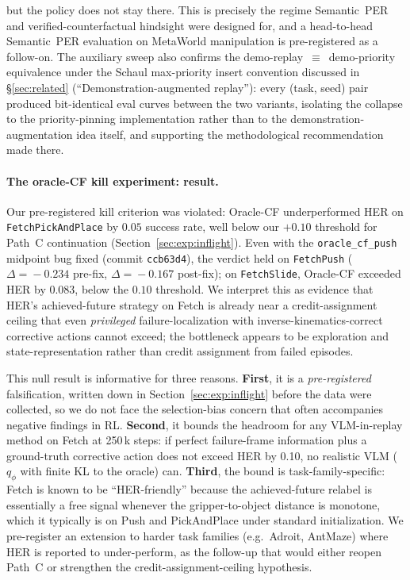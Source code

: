 \documentclass{article}
\begin{document}
but the policy does not stay there. This is precisely the regime
Semantic~PER and verified-counterfactual hindsight were designed for,
and a head-to-head Semantic~PER evaluation on MetaWorld manipulation
is pre-registered as a follow-on. The auxiliary sweep also confirms
the demo-replay~$\equiv$~demo-priority equivalence under the Schaul
max-priority insert convention discussed in \S\ref{sec:related}
(``Demonstration-augmented replay''): every (task, seed) pair
produced bit-identical eval curves between the two variants, isolating
the collapse to the priority-pinning implementation rather than to the
demonstration-augmentation idea itself, and supporting the
methodological recommendation made there.

\paragraph{The oracle-CF kill experiment: result.}
Our pre-registered kill criterion was violated: Oracle-CF underperformed
HER on \texttt{FetchPickAndPlace} by $0.05$ success rate, well below
our $+0.10$ threshold for Path~C continuation
(Section~\ref{sec:exp:inflight}). Even with the
\texttt{oracle\_cf\_push} midpoint bug fixed (commit \texttt{ccb63d4}),
the verdict held on \texttt{FetchPush} ($\Delta\!=\!-0.234$ pre-fix,
$\Delta\!=\!-0.167$ post-fix); on \texttt{FetchSlide}, Oracle-CF exceeded
HER by $0.083$, below the $0.10$ threshold. We interpret this as
evidence that HER's achieved-future strategy on Fetch is already near a
credit-assignment ceiling that even \emph{privileged} failure-localization
with inverse-kinematics-correct corrective actions cannot exceed; the
bottleneck appears to be exploration and state-representation rather than
credit assignment from failed episodes.

This null result is informative for three reasons.
\textbf{First}, it is a \emph{pre-registered} falsification, written down
in Section~\ref{sec:exp:inflight} before the data were collected, so we
do not face the selection-bias concern that often accompanies negative
findings in RL.
\textbf{Second}, it bounds the headroom for any VLM-in-replay method on
Fetch at 250\,k steps: if perfect failure-frame information plus a
ground-truth corrective action does not exceed HER by 0.10, no realistic
VLM ($q_\phi$ with finite KL to the oracle) can.
\textbf{Third}, the bound is task-family-specific: Fetch is known to be
``HER-friendly'' because the achieved-future relabel is essentially a
free signal whenever the gripper-to-object distance is monotone, which it
typically is on Push and PickAndPlace under standard initialization. We
pre-register an extension to harder task families (e.g.\ Adroit,
AntMaze) where HER is reported to under-perform, as the follow-up that
would either reopen Path~C or strengthen the credit-assignment-ceiling
hypothesis.
\end{document}
